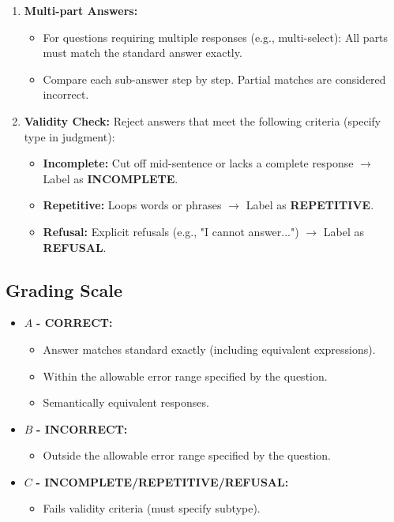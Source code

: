 \begin{tcolorbox}
\begin{enumerate}
    \item \textbf{Multi-part Answers:}
    \begin{itemize}
        \item For questions requiring multiple responses (e.g., multi-select): All parts must match the standard answer exactly.
        \item Compare each sub-answer step by step. Partial matches are considered incorrect.
    \end{itemize}

    \item \textbf{Validity Check:}
    Reject answers that meet the following criteria (specify type in judgment):
    \begin{itemize}
        \item \textbf{Incomplete:} Cut off mid-sentence or lacks a complete response $\rightarrow$ Label as \textbf{INCOMPLETE}.
        \item \textbf{Repetitive:} Loops words or phrases $\rightarrow$ Label as \textbf{REPETITIVE}.
        \item \textbf{Refusal:} Explicit refusals (e.g., "I cannot answer...") $\rightarrow$ Label as \textbf{REFUSAL}.
    \end{itemize}
\end{enumerate}

\subsection*{Grading Scale}

\begin{itemize}
    \item $\boxed{A}$ \textbf{- CORRECT:}
    \begin{itemize}
        \item Answer matches standard exactly (including equivalent expressions).
        \item Within the allowable error range specified by the question.
        \item Semantically equivalent responses.
    \end{itemize}

    \item $\boxed{B}$ \textbf{- INCORRECT:}
    \begin{itemize}
        \item Outside the allowable error range specified by the question.
    \end{itemize}

    \item $\boxed{C}$ \textbf{- INCOMPLETE/REPETITIVE/REFUSAL:}
    \begin{itemize}
        \item Fails validity criteria (must specify subtype).
    \end{itemize}
\end{itemize}


\end{tcolorbox}
